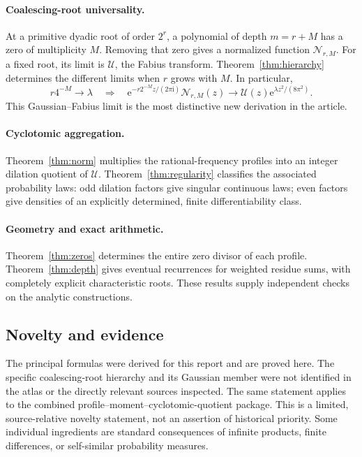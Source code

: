 \documentclass[11pt,letterpaper]{article}
\numberwithin{equation}{section}
\theoremstyle{definition}
\theoremstyle{remark}
\newcommand{\ii}{\mathrm i}
\newcommand{\Up}{\mathcal U}
\newcommand{\Np}{\mathcal N}
\newcommand{\e}{\mathrm e}
\begin{document}
\paragraph{Coalescing-root universality.}
At a primitive dyadic root of order \(2^r\), a polynomial of depth \(m=r+M\) has a zero of multiplicity \(M\). Removing that zero gives a normalized function \(\Np_{r,M}\). For a fixed root, its limit is \(\Up\), the Fabius transform. Theorem~\ref{thm:hierarchy} determines the different limits when \(r\) grows with \(M\). In particular,
\[
 r4^{-M}\longrightarrow\lambda
 \quad\Longrightarrow\quad
 \e^{-r2^{-M}z/(2\pi\ii)}\Np_{r,M}(z)
 \longrightarrow \Up(z)\e^{\lambda z^2/(8\pi^2)}.
\]
This Gaussian--Fabius limit is the most distinctive new derivation in the article.

\paragraph{Cyclotomic aggregation.}
Theorem~\ref{thm:norm} multiplies the rational-frequency profiles into an integer dilation quotient of \(\Up\). Theorem~\ref{thm:regularity} classifies the associated probability laws: odd dilation factors give singular continuous laws; even factors give densities of an explicitly determined, finite differentiability class.

\paragraph{Geometry and exact arithmetic.}
Theorem~\ref{thm:zeros} determines the entire zero divisor of each profile. Theorem~\ref{thm:depth} gives eventual recurrences for weighted residue sums, with completely explicit characteristic roots. These results supply independent checks on the analytic constructions.

\subsection{Novelty and evidence}
The principal formulas were derived for this report and are proved here. The specific coalescing-root hierarchy and its Gaussian member were not identified in the atlas or the directly relevant sources inspected. The same statement applies to the combined profile--moment--cyclotomic-quotient package. This is a limited, source-relative novelty statement, not an assertion of historical priority. Some individual ingredients are standard consequences of infinite products, finite differences, or self-similar probability measures.
\end{document}
